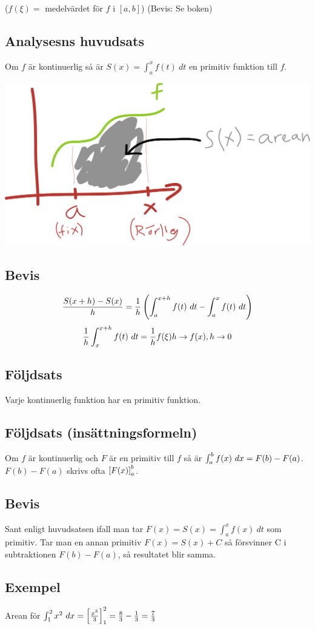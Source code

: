 \documentclass{article}
\newcommand{\intx}[1]{\int^x_a{#1\ dt}}
\begin{document}
($f(\xi)=$ medelvärdet för $f$ i $[a,b]$)
(Bevis: Se boken)

\subsection{Analysesns huvudsats}
Om $f$ är kontinuerlig så är $S(x) = \intx{f(t)}$ en primitiv funktion till $f$.

\includegraphics[scale=0.25]{img/img5.pdf}

\subsection{Bevis}
$$ \f{S(x+h) - S(x)}h = \f 1h \pa{\int_a^{x+h}{f(t)\ dt} - \intx{f(t)}} $$
$$ \frac{1}{h}\int^{x+h}_x{f(t)\ dt} = \frac{1}{h} f(\xi) h \to f(x), h \to 0$$

\subsection{Följdsats}
Varje kontinuerlig funktion har en primitiv funktion.

\subsection{Följdsats (insättningsformeln)}
Om $f$ är kontinuerlig och $F$ är en primitiv till $f$ så är $\int^b_a{f(x)\ dx} = F(b)-F(a)$.\\
$ F(b)-F(a) $ skrivs ofta $\left[F(x)\right]_a^b$.

\subsection{Bevis}
Sant enligt huvudsatsen ifall man tar $F(x)=S(x)=\intx{f(x)}$ som primitiv.
Tar man en annan primitiv $F(x)=S(x)+C$ så försvinner C i subtraktionen $F(b)-F(a)$,
så resultatet blir samma.

\subsection{Exempel}
Arean för $\int^2_1{x^2\ dx} = \left[\frac{x^3}{3}\right]^2_1 = \frac{8}{3} - \frac{1}{3} = \frac{7}{3} $
\end{document}
